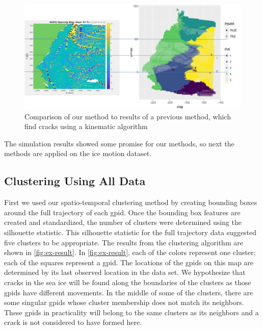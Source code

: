 \documentclass[12pt]{article}
\begin{document}
\begin{figure}[tbp]

{\centering \includegraphics[width=1\linewidth,]{images/all_weeks_comp_correct} 

}

\caption{Comparison of our method to results of a previous method, which find cracks using a kinematic algorithm}\label{fig:all-week-comp}
\end{figure}

The simulation results showed some promise for our methods, so next the
methods are applied on the ice motion dataset.

\hypertarget{clustering-using-all-data}{%
\subsection{Clustering Using All Data}\label{clustering-using-all-data}}

First we used our spatio-temporal clustering method by creating bounding
boxes around the full trajectory of each gpid. Once the bounding box
features are created and standardized, the number of clusters were
determined using the silhouette statistic. This silhouette statistic for
the full trajectory data suggested five clusters to be appropriate. The
results from the clustering algorithm are shown in \cref{fig:ex-result}.
In \cref{fig:ex-result}, each of the colors represent one cluster; each
of the squares represent a gpid. The locations of the gpids on this map
are determined by its last observed location in the data set. We
hypothesize that cracks in the sea ice will be found along the
boundaries of the clusters as those gpids have different movements. In
the middle of some of the clusters, there are some singular gpids whose
cluster membership does not match its neighbors. These gpids in
practicality will belong to the same clusters as its neighbors and a
crack is not considered to have formed here.
\end{document}
